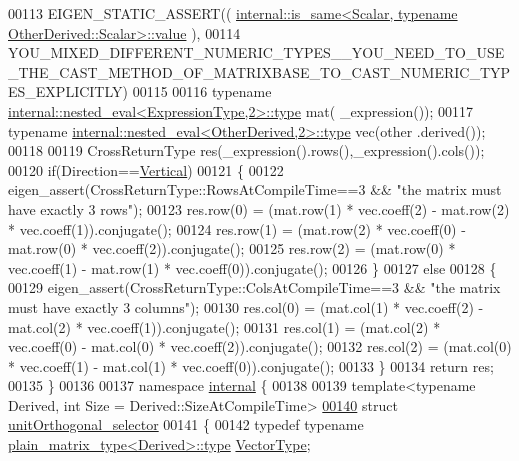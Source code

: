 \begin{DoxyCode}
00113   EIGEN\_STATIC\_ASSERT((
      \hyperlink{struct_eigen_1_1internal_1_1is__same}{internal::is\_same<Scalar, typename OtherDerived::Scalar>::value}
      ),
00114     
      YOU\_MIXED\_DIFFERENT\_NUMERIC\_TYPES\_\_YOU\_NEED\_TO\_USE\_THE\_CAST\_METHOD\_OF\_MATRIXBASE\_TO\_CAST\_NUMERIC\_TYPES\_EXPLICITLY)
00115   
00116   \textcolor{keyword}{typename} \hyperlink{class_eigen_1_1internal_1_1_tensor_lazy_evaluator_writable}{internal::nested\_eval<ExpressionType,2>::type} mat(
      \_expression());
00117   \textcolor{keyword}{typename} \hyperlink{class_eigen_1_1internal_1_1_tensor_lazy_evaluator_writable}{internal::nested\_eval<OtherDerived,2>::type} vec(other
      .derived());
00118 
00119   CrossReturnType res(\_expression().rows(),\_expression().cols());
00120   \textcolor{keywordflow}{if}(Direction==\hyperlink{group__enums_ggad49a7b3738e273eb00932271b36127f7addca718e0564723df21d61b94b1198be}{Vertical})
00121   \{
00122     eigen\_assert(CrossReturnType::RowsAtCompileTime==3 && \textcolor{stringliteral}{"the matrix must have exactly 3 rows"});
00123     res.row(0) = (mat.row(1) * vec.coeff(2) - mat.row(2) * vec.coeff(1)).conjugate();
00124     res.row(1) = (mat.row(2) * vec.coeff(0) - mat.row(0) * vec.coeff(2)).conjugate();
00125     res.row(2) = (mat.row(0) * vec.coeff(1) - mat.row(1) * vec.coeff(0)).conjugate();
00126   \}
00127   \textcolor{keywordflow}{else}
00128   \{
00129     eigen\_assert(CrossReturnType::ColsAtCompileTime==3 && \textcolor{stringliteral}{"the matrix must have exactly 3 columns"});
00130     res.col(0) = (mat.col(1) * vec.coeff(2) - mat.col(2) * vec.coeff(1)).conjugate();
00131     res.col(1) = (mat.col(2) * vec.coeff(0) - mat.col(0) * vec.coeff(2)).conjugate();
00132     res.col(2) = (mat.col(0) * vec.coeff(1) - mat.col(1) * vec.coeff(0)).conjugate();
00133   \}
00134   \textcolor{keywordflow}{return} res;
00135 \}
00136 
00137 \textcolor{keyword}{namespace }\hyperlink{namespaceinternal}{internal} \{
00138 
00139 \textcolor{keyword}{template}<\textcolor{keyword}{typename} Derived, \textcolor{keywordtype}{int} Size = Derived::SizeAtCompileTime>
\hyperlink{struct_eigen_1_1internal_1_1unit_orthogonal__selector}{00140} \textcolor{keyword}{struct }\hyperlink{struct_eigen_1_1internal_1_1unit_orthogonal__selector}{unitOrthogonal\_selector}
00141 \{
00142   \textcolor{keyword}{typedef} \textcolor{keyword}{typename} \hyperlink{struct_eigen_1_1internal_1_1plain__matrix__type}{plain\_matrix\_type<Derived>::type} 
      \hyperlink{struct_vector_type}{VectorType};

\end{DoxyCode}
